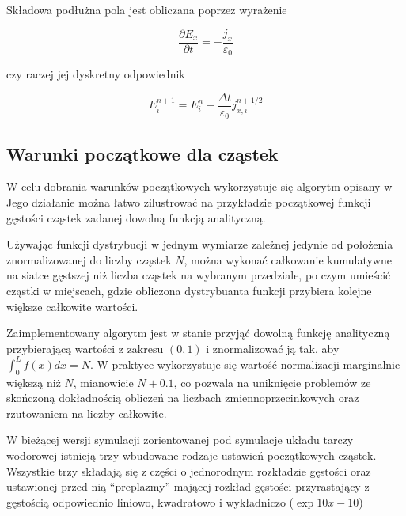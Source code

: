 Składowa podłużna pola jest obliczana poprzez wyrażenie

\begin{equation}
\frac{\partial E_x}{\partial t} = - \frac{j_x}{\varepsilon_0}
\label{longitudinal-field-differential}
\end{equation}

czy raczej jej dyskretny odpowiednik

\begin{equation}
    E_i^{n+1} = E_i^n - \frac{\Delta t}{\varepsilon_0} j_{x,i}^{n+1/2}
\label{longitudinal-field-finite-differential}
\end{equation}


\subsection{Warunki początkowe dla cząstek}

W celu dobrania warunków początkowych wykorzystuje się algorytm opisany w
 Jego działanie można łatwo zilustrować na
przykładzie początkowej funkcji gęstości cząstek zadanej dowolną funkcją
analityczną. 

Używając funkcji dystrybucji w jednym wymiarze zależnej jedynie od
położenia znormalizowanej do liczby cząstek $N$, można wykonać całkowanie
kumulatywne na siatce gęstszej niż liczba cząstek na wybranym przedziale,
po czym umieścić cząstki w miejscach, gdzie obliczona dystrybuanta funkcji
 przybiera kolejne większe całkowite wartości.


Zaimplementowany algorytm jest w stanie przyjąć dowolną funkcję analityczną
przybierającą  wartości z zakresu $(0, 1)$
i znormalizować ją tak, aby $\int_0^L
f(x) dx = N$. W praktyce wykorzystuje się wartość normalizacji marginalnie
większą niż $N$, mianowicie $N+0.1$, co pozwala na uniknięcie problemów ze
skończoną dokładnością obliczeń na liczbach zmiennoprzecinkowych oraz
rzutowaniem na liczby całkowite.

W bieżącej wersji symulacji zorientowanej pod symulacje układu tarczy
wodorowej istnieją trzy wbudowane rodzaje ustawień początkowych cząstek.
Wszystkie trzy składają się z części o jednorodnym rozkładzie gęstości oraz
ustawionej przed nią ``preplazmy'' mającej rozkład gęstości przyrastający z
gęstością odpowiednio liniowo, kwadratowo i wykładniczo ($\exp{10 x - 10}$)

